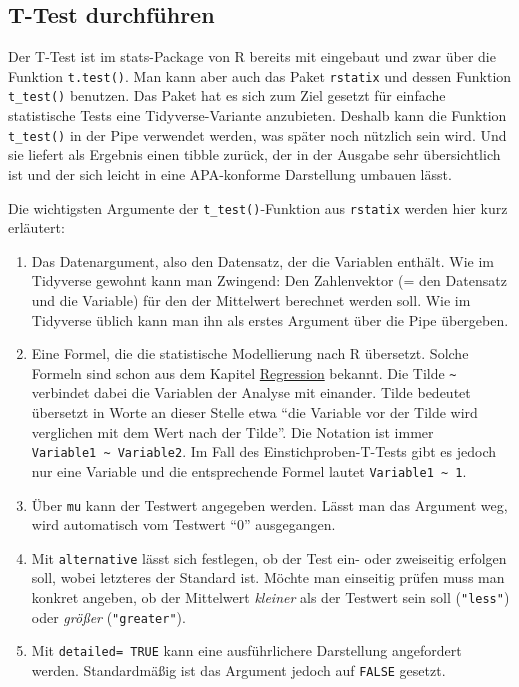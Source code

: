 \documentclass[
]{book}
\begin{document}
\hypertarget{t-test-durchfuxfchren}{%
\subsection{T-Test durchführen}\label{t-test-durchfuxfchren}}

Der T-Test ist im stats-Package von R bereits mit eingebaut und zwar über die Funktion \texttt{t.test()}. Man kann aber auch das Paket \texttt{rstatix} und dessen Funktion \texttt{t\_test()} benutzen. Das Paket hat es sich zum Ziel gesetzt für einfache statistische Tests eine Tidyverse-Variante anzubieten. Deshalb kann die Funktion \texttt{t\_test()} in der Pipe verwendet werden, was später noch nützlich sein wird. Und sie liefert als Ergebnis einen tibble zurück, der in der Ausgabe sehr übersichtlich ist und der sich leicht in eine APA-konforme Darstellung umbauen lässt.

Die wichtigsten Argumente der \texttt{t\_test()}-Funktion aus \texttt{rstatix} werden hier kurz erläutert:

\begin{enumerate}
\def\labelenumi{\arabic{enumi}.}
\item
  Das Datenargument, also den Datensatz, der die Variablen enthält. Wie im Tidyverse gewohnt kann man
  Zwingend: Den Zahlenvektor (= den Datensatz und die Variable) für den der Mittelwert berechnet werden soll. Wie im Tidyverse üblich kann man ihn als erstes Argument über die Pipe übergeben.
\item
  Eine Formel, die die statistische Modellierung nach R übersetzt. Solche Formeln sind schon aus dem Kapitel \protect\hyperlink{regression}{Regression} bekannt. Die Tilde \texttt{\textasciitilde{}} verbindet dabei die Variablen der Analyse mit einander. Tilde bedeutet übersetzt in Worte an dieser Stelle etwa ``die Variable vor der Tilde wird verglichen mit dem Wert nach der Tilde''. Die Notation ist immer \texttt{Variable1\ \textasciitilde{}\ Variable2}. Im Fall des Einstichproben-T-Tests gibt es jedoch nur eine Variable und die entsprechende Formel lautet \texttt{Variable1\ \textasciitilde{}\ 1}.
\item
  Über \texttt{mu} kann der Testwert angegeben werden. Lässt man das Argument weg, wird automatisch vom Testwert ``0'' ausgegangen.
\item
  Mit \texttt{alternative} lässt sich festlegen, ob der Test ein- oder zweiseitig erfolgen soll, wobei letzteres der Standard ist. Möchte man einseitig prüfen muss man konkret angeben, ob der Mittelwert \emph{kleiner} als der Testwert sein soll (\texttt{"less"}) oder \emph{größer} (\texttt{"greater"}).
\item
  Mit \texttt{detailed=\ TRUE} kann eine ausführlichere Darstellung angefordert werden. Standardmäßig ist das Argument jedoch auf \texttt{FALSE} gesetzt.
\end{enumerate}
\end{document}
